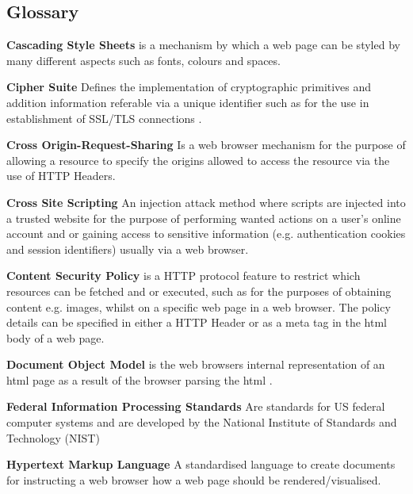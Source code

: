 \documentclass{mscreport}
\begin{document}
\newpage

\begin{center}
\section*{Glossary}
\end{center}

\begin{hangparas}{.25in}{1}
\textbf{Cascading Style Sheets} is a mechanism by which a web page can be styled by many different aspects such as fonts, colours and spaces. \par
\textbf{Cipher Suite} Defines the implementation of cryptographic primitives and addition information referable via a unique identifier such as  for the use in establishment of SSL/TLS connections \cite{Ristic2017-aj}. \par
\textbf{Cross Origin-Request-Sharing} Is a web browser mechanism for the purpose of allowing a resource to specify the origins allowed to access the resource via the use of HTTP Headers. \par
\textbf{Cross Site Scripting} An injection attack method where scripts are injected into a trusted website for the purpose of performing wanted actions on a user’s online account and or gaining access to sensitive information (e.g. authentication cookies and session identifiers) usually via a web browser. \par
\textbf{Content Security Policy} is a HTTP protocol feature to restrict which resources can be fetched and or executed, such as for the purposes of obtaining content e.g. images, whilst on a specific web page in a web browser. The policy details can be specified in either a HTTP Header or as a meta tag in the html body of a web page. \par
\vspace{0.5cm}
\textbf{Document Object Model} is the web browsers internal representation of an html page as a result of the browser parsing the html \cite{Apple_undated-ay}. \par
\vspace{0.5cm}
\textbf{Federal Information Processing Standards} Are standards for US federal computer systems and are developed by the National Institute of Standards and Technology (NIST) \par
\vspace{0.5cm}
\textbf{Hypertext Markup Language} A standardised language to create documents \cite{Berners-Lee1995-hg} for instructing a web browser how a web page should be rendered/visualised. \par

\end{hangparas}
\end{document}
